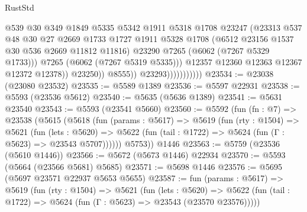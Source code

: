 \begin{lexlean}{RustStd}
\begin{coremodule}
                                        @539
                                        @30
                                        @349
                                        @1849
                                        @5335
                                        @5342
                                        @1911
                                        @5318
                                        @1708
                                        @23247
                                        (@23313
                                          @537
                                          @48
                                          @30
                                          @27
                                          @2669
                                          @1733
                                          @1727
                                          @1911
                                          @5328
                                          @1708
                                          (@6512 @23156 @1537 @30 @536 @2669 @11812 @11816)
                                          @23290
                                          @7265
                                          (@6062 (@7267 @5329 @1733)))
                                        @7265
                                        (@6062 (@7267 @5319 @5335)))
                                      @12357
                                      @12360
                                      @12363
                                      @12367
                                      @12372
                                      @12378))
                                  @23250))
                              @8555))
                          @23293)))))))))))
@23534 := @23038 (@23080 @23532)
@23535 := @5589 @1389
@23536 := @5597 @22931
@23538 := @5593 (@23536 @5612)
@23540 := @5635 (@5636 @1389)
@23541 := @5631 @23540
@23543 := @5593 (@23541 @5660)
@23560 := @5592
    (fun (fn : @7) =>
    @23538
      (@5615
        (@5618
          (fun (params : @5617) =>
          @5619
            (fun (rty : @1504) =>
            @5621
              (fun (lets : @5620) =>
              @5622 (fun (tail : @1722) => @5624 (fun (Γ : @5623) => @23543 @5707))))))
        @5753))
    @1446
@23563 := @5759 (@23536 (@5610 @1446))
@23566 := @5672 (@5673 @1446) @22934
@23570 := @5593 (@5664 (@23566 @5681) @5685)
@23571 := @5698 @1446
@23576 := @5695 (@5697 @23571 @22937 @5653 @5655)
@23587 := fun (params : @5617) =>
  @5619
    (fun (rty : @1504) =>
    @5621
      (fun (lets : @5620) =>
      @5622 (fun (tail : @1722) => @5624 (fun (Γ : @5623) => @23543 (@23570 @23576)))))

\end{coremodule}
\end{lexlean}
